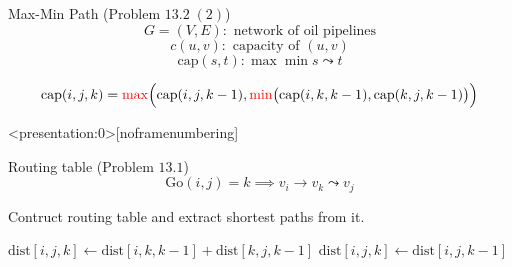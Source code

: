 \begin{frame}{}
  \begin{exampleblock}{Max-Min Path (Problem $13.2\; (2)$)}
    \[
      G = (V, E): \text{ network of oil pipelines}
    \]
    \[
      c(u,v): \text{ capacity of } (u,v)
    \]
    \[
      \text{cap}(s,t): \max \min s \leadsto t
    \]
      
    \vspace{0.30cm}
    \centerline{}
  \end{exampleblock}

  \pause
  \[
    \text{cap}(i,j,k) = \textcolor{red}{\max}\Big(\text{cap}(i,j,k-1), \textcolor{red}{\min}\big(\text{cap}(i,k,k-1), \text{cap}(k,j,k-1)\big)\Big)
  \]

  \pause
\end{frame}

\begin{frame}<presentation:0>[noframenumbering]
  \begin{exampleblock}{Routing table (Problem $13.1$)}
    \[
      \text{Go}(i,j) = k \implies v_i \to v_k \leadsto v_j
    \]

    Contruct routing table and extract shortest paths from it.
  \end{exampleblock}

  \pause
  \vspace{0.30cm}
  \begin{algorithmic}
	    \State $\text{dist}[i,j,k] \gets \text{dist}[i,k,k-1] + \text{dist}[k,j,k-1]$
	    \uncover<3->{\State \textcolor{red}{$\text{Go}[i,j] \gets \text{Go}[i,k]$}}
	  \Else
	    \State $\text{dist}[i,j,k] \gets \text{dist}[i,j,k-1]$
	  \EndIf
	\EndFor
      \EndFor
    \EndFor
  \end{algorithmic}
\end{frame}

